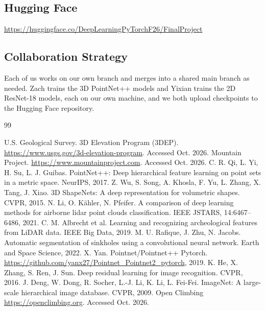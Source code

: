 \documentclass{mva2011}
\begin{document}
    \subsection{Hugging Face}
    \url{https://huggingface.co/DeepLearningPyTorchF26/FinalProject}
   \subsection{Collaboration Strategy}
   Each of us works on our own branch and merges into a shared main branch as needed. Zach trains the 3D PointNet++ models and Yixian trains the 2D ResNet-18 models, each on our own machine, and we both upload checkpoints to the Hugging Face repository.

   

\begin{thebibliography}{99}

 U.S. Geological Survey. 3D Elevation Program (3DEP). \url{https://www.usgs.gov/3d-elevation-program}. Accessed Oct. 2026.
 Mountain Project.
\url{https://www.mountainproject.com}. Accessed Oct. 2026.
 C. R. Qi, L. Yi, H. Su, L. J. Guibas. PointNet++: Deep hierarchical feature learning on point sets in a metric space. NeurIPS, 2017.
 Z. Wu, S. Song, A. Khosla, F. Yu, L. Zhang, X. Tang, J. Xiao. 3D ShapeNets: A deep representation for volumetric shapes. CVPR, 2015.
 N. Li, O. K\"ahler, N. Pfeifer. A comparison of deep learning methods for airborne lidar point clouds classification. IEEE JSTARS, 14:6467--6486, 2021.
 C. M. Albrecht et al. Learning and recognizing archeological features from LiDAR data. IEEE Big Data, 2019.
 M. U. Rafique, J. Zhu, N. Jacobs. Automatic segmentation of sinkholes using a convolutional neural network. Earth and Space Science, 2022.
 X. Yan. Pointnet/Pointnet++ Pytorch. \url{https://github.com/yanx27/Pointnet_Pointnet2_pytorch}, 2019.
 K. He, X. Zhang, S. Ren, J. Sun. Deep residual learning for image recognition. CVPR, 2016.
 J. Deng, W. Dong, R. Socher, L.-J. Li, K. Li, L. Fei-Fei. ImageNet: A large-scale hierarchical image database. CVPR, 2009.
 Open Climbing \url{https://openclimbing.org}. Accessed Oct. 2026.
\end{thebibliography}
\end{document}
